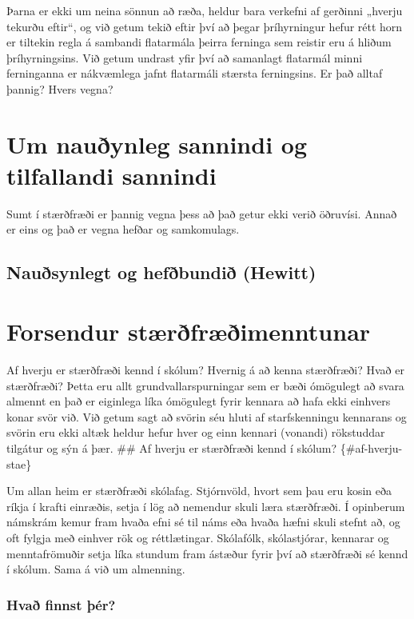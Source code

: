 \documentclass[
  icelandic,
]{book}
\theoremstyle{definition}
\theoremstyle{definition}
\theoremstyle{definition}
\theoremstyle{definition}
\theoremstyle{remark}
\begin{document}
Þarna er ekki um neina sönnun að ræða, heldur bara verkefni af gerðinni „hverju tekurðu eftir``, og við getum tekið eftir því að þegar þríhyrningur hefur rétt horn er tiltekin regla á sambandi flatarmála þeirra ferninga sem reistir eru á hliðum þríhyrningsins. Við getum undrast yfir því að samanlagt flatarmál minni ferninganna er nákvæmlega jafnt flatarmáli stærsta ferningsins. Er það alltaf þannig? Hvers vegna?

\chapter{Um nauðynleg sannindi og tilfallandi sannindi}\label{naudsyn_venjur}

Sumt í stærðfræði er þannig vegna þess að það getur ekki verið öðruvísi. Annað er eins og það er vegna hefðar og samkomulags.

\section{Nauðsynlegt og hefðbundið (Hewitt)}\label{abitrary-necessary}

\chapter{Forsendur stærðfræðimenntunar}\label{forsendur-staemenntunar}

Af hverju er stærðfræði kennd í skólum? Hvernig á að kenna stærðfræði? Hvað er stærðfræði? Þetta eru allt grundvallarspurningar sem er bæði ómögulegt að svara almennt en það er eiginlega líka ómögulegt fyrir kennara að hafa ekki einhvers konar svör við. Við getum sagt að svörin séu hluti af starfskenningu kennarans og svörin eru ekki altæk heldur hefur hver og einn kennari (vonandi) rökstuddar tilgátur og sýn á þær.
\#\# Af hverju er stærðfræði kennd í skólum? \{\#af-hverju-stae\}

Um allan heim er stærðfræði skólafag. Stjórnvöld, hvort sem þau eru kosin eða ríkja í krafti einræðis, setja í lög að nemendur skuli læra stærðfræði. Í opinberum námskrám kemur fram hvaða efni sé til náms eða hvaða hæfni skuli stefnt að, og oft fylgja með einhver rök og réttlætingar. Skólafólk, skólastjórar, kennarar og menntafrömuðir setja líka stundum fram ástæður fyrir því að stærðfræði sé kennd í skólum. Sama á við um almenning.

\subsection{Hvað finnst þér?}\label{thinar-astaedur}
\end{document}
